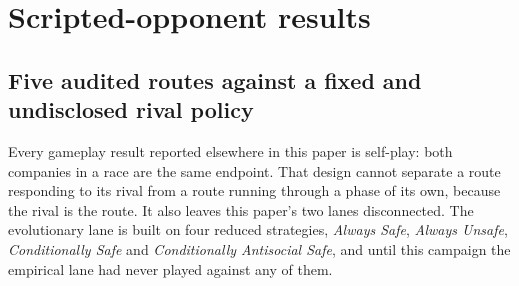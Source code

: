\documentclass{article}
\DeclareRobustCommand{\citep}[1]{\cite{#1}}
\begin{document}

\section{Scripted-opponent results}

\subsection{Five audited routes against a fixed and undisclosed rival policy}
\label{app:scripted-opponent}

Every gameplay result reported elsewhere in this paper is self-play: both
companies in a race are the same endpoint. That design cannot separate a route
responding to its rival from a route running through a phase of its own, because
the rival is the route. It also leaves this paper's two lanes disconnected. The
evolutionary lane is built on four reduced strategies, \emph{Always Safe},
\emph{Always Unsafe}, \emph{Conditionally Safe} and \emph{Conditionally
Antisocial Safe}, and until this campaign the empirical lane had never played against any of them.
\end{document}
